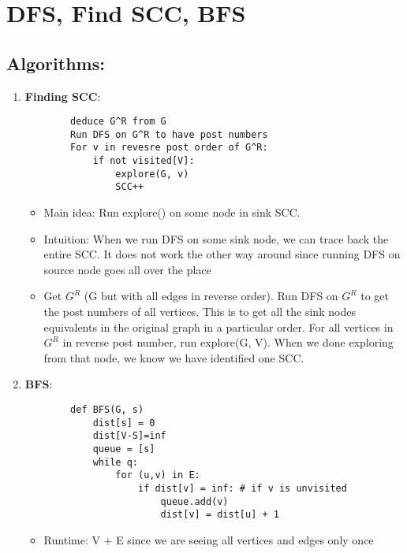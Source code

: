
\section[DFS, Find SCC, BFS -- {\it Lecture 6}]{DFS, Find SCC, BFS}


\subsection{Algorithms: }
    \begin{enumerate}
        \item \textbf{Finding SCC}:
        \begin{verbatim}
        deduce G^R from G
        Run DFS on G^R to have post numbers
        For v in revesre post order of G^R:
            if not visited[V]:
                explore(G, v)
                SCC++
        \end{verbatim}
            \begin{itemize}
                \item Main idea: Run explore() on some node in sink SCC.
                \item Intuition: When we run DFS on some sink node, we can trace back the entire SCC. It does not work the other way around since running DFS on source node goes all over the place
                \item Get $G^R$ (G but with all edges in reverse order). Run DFS on $G^R$ to get the post numbers of all vertices. This is to get all the sink nodes equivalents in the original graph in a particular order. For all vertices in $G^R$ in reverse post number, run explore(G, V). When we done exploring from that node, we know we have identified one SCC.
            \end{itemize}
        \item \textbf{BFS}:
        \begin{verbatim}
        def BFS(G, s)
            dist[s] = 0
            dist[V-S]=inf
            queue = [s]
            while q:
                for (u,v) in E:
                    if dist[v] = inf: # if v is unvisited
                        queue.add(v)
                        dist[v] = dist[u] + 1                    
        \end{verbatim}
            \begin{itemize}
                \item Runtime: V + E since we are seeing all vertices and edges only once
            \end{itemize}
    \end{enumerate}

